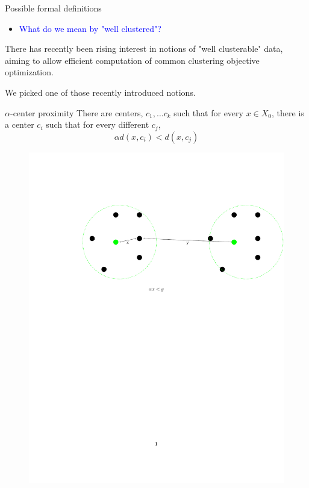 \documentclass{beamer}
\begin{document}
\begin{frame}
{Possible formal definitions}

\begin{itemize}
\item  \textcolor{blue}{What do we mean by "well clustered"?}
\end{itemize}

\vspace{0.5cm}
There has recently been rising interest in notions of "well clusterable" data,
aiming to allow efficient computation of common clustering objective optimization.

\vspace{0.5cm}
We picked one of those recently introduced notions.
\end{frame}
\begin{frame}
{$\alpha$-center proximity}
There are centers, $c_1, \ldots c_k$ such that for every $x \in X_0$, there is a center $c_i$ such that for every different $c_j$,
   $$\alpha d(x, c_i) < d(x, c_j)$$ 
   \vspace{0.5cm}
   \begin{figure}
	  \includegraphics[trim = 0 0 0 100, clip, width=\linewidth]{1.pdf}
   \end{figure}




\end{frame}
\end{document}

